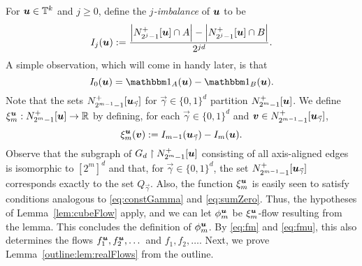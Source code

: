 \documentclass[12pt,a4paper]{amsart}
\numberwithin{equation}{section}
\theoremstyle{definition}
\begin{document}
For $\boldsymbol{u}\in\mathbb{T}^k$ and $j\geq0$, define the \emph{$j$-imbalance} of $\boldsymbol{u}$ to be
\[I_j(\boldsymbol{u}):=\frac{\left|N_{2^j-1}^+[\boldsymbol{u}]\cap A\right| - \left|N_{2^j-1}^+[\boldsymbol{u}]\cap B\right|}{2^{jd}}.\]
A simple observation, which will come in handy later, is that
\begin{equation}
\label{eq:I0}
I_0(\vvec{u})=\ind_A(\vvec{u})-\ind_B(\vvec{u}). 
\end{equation}
Note that the sets $N_{2^{m-1}-1}^+[\boldsymbol{u}_{\vec{\gamma}}]$ for $\vec{\gamma}\in\{0,1\}^d$ partition $N_{2^m-1}^+[\boldsymbol{u}]$. We define $\xi_m^{\boldsymbol{u}}: N_{2^{m}-1}^+[\boldsymbol{u}]\to \mathbb{R}$ by defining, for each $\vec{\gamma}\in \{0,1\}^d$ and $\boldsymbol{v}\in N_{2^{m-1}-1}^+[\boldsymbol{u}_{\vec{\gamma}}]$,
\[\xi_m^{\boldsymbol{u}}(\boldsymbol{v}) := I_{m-1}(\boldsymbol{u}_{\vec{\gamma}}) - I_m(\boldsymbol{u}).\]
Observe that the subgraph of $G_d\upharpoonright N_{2^{m}-1}^+[\boldsymbol{u}]$ consisting of all axis-aligned edges is isomorphic to $[2^m]^d$ and that, for $\vec{\gamma}\in\{0,1\}^d$, the set $N_{2^{m-1}-1}^+[\boldsymbol{u}_{\vec{\gamma}}]$ corresponds exactly to the set $Q_{\vec{\gamma}}$. Also, the function $\xi_m^{\boldsymbol{u}}$ is easily seen to satisfy conditions analogous to \eqref{eq:constGamma} and \eqref{eq:sumZero}. Thus, the hypotheses of Lemma~\ref{lem:cubeFlow} apply, and we can let $\phi_m^{\boldsymbol{u}}$ be $\xi_m^{\boldsymbol{u}}$-flow resulting from the lemma. This concludes the definition of $\phi_m^{\boldsymbol{u}}$. By \eqref{eq:fm} and \eqref{eq:fmu}, this also determines the flows $f_1^{\boldsymbol{u}},f_2^{\boldsymbol{u}},\dots$ and $f_1,f_2,\dots$. Next, we prove Lemma~\ref{outline:lem:realFlows} from the outline.
\end{document}
